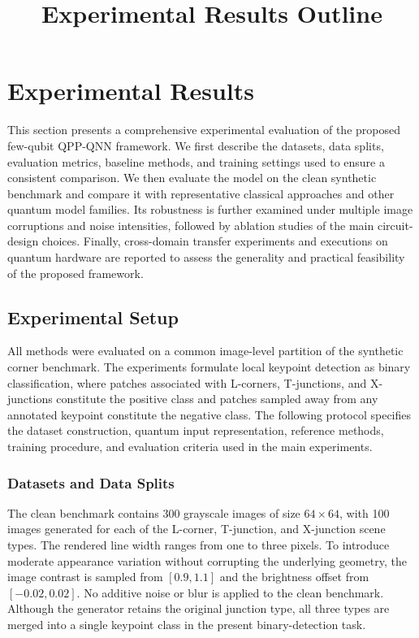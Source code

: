 \documentclass[11pt]{article}
\title{Experimental Results Outline}
\author{}
\date{}
\begin{document}
\maketitle
\tableofcontents

\section{Experimental Results}

This section presents a comprehensive experimental evaluation of the proposed
few-qubit QPP-QNN framework. We first describe the datasets, data splits,
evaluation metrics, baseline methods, and training settings used to ensure a
consistent comparison. We then evaluate the model on the clean synthetic
benchmark and compare it with representative classical approaches and other
quantum model families. Its robustness is further examined under multiple
image corruptions and noise intensities, followed by ablation studies of the
main circuit-design choices. Finally, cross-domain transfer experiments and
executions on quantum hardware are reported to assess the generality and
practical feasibility of the proposed framework.

\subsection{Experimental Setup}
\label{sec:experimental-setup}

All methods were evaluated on a common image-level partition of the synthetic
corner benchmark. The experiments formulate local keypoint detection as binary
classification, where patches associated with L-corners, T-junctions, and
X-junctions constitute the positive class and patches sampled away from any
annotated keypoint constitute the negative class. The following protocol
specifies the dataset construction, quantum input representation, reference
methods, training procedure, and evaluation criteria used in the main
experiments.

\subsubsection{Datasets and Data Splits}

The clean benchmark contains 300 grayscale images of size $64\times64$, with
100 images generated for each of the L-corner, T-junction, and X-junction scene
types. The rendered line width ranges from one to three pixels. To introduce
moderate appearance variation without corrupting the underlying geometry, the
image contrast is sampled from $[0.9,1.1]$ and the brightness offset from
$[-0.02,0.02]$. No additive noise or blur is applied to the clean benchmark.
Although the generator retains the original junction type, all three types are
merged into a single keypoint class in the present binary-detection task.
\end{document}
